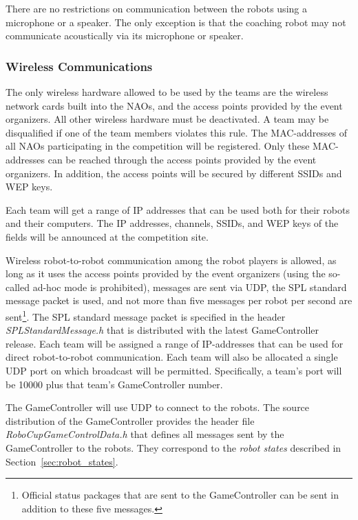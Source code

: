 \documentclass[12pt]{article}
\begin{document}
There are no restrictions on communication between the robots using a microphone or a speaker.  The only exception is that the coaching robot may not communicate acoustically via its microphone or speaker.

\subsubsection{Wireless Communications}
\label{sec:wireless}
The only wireless hardware allowed to be used by the teams are the wireless network cards built into the NAOs, and the access points provided by the event organizers. All other wireless hardware must be deactivated. A team may be disqualified if one of the team members violates this rule. The MAC-addresses of all NAOs participating in the competition will be registered. Only these MAC-addresses can be reached through the access points provided by the event organizers. In addition, the access points will be secured by different SSIDs and WEP keys. 

Each team will get a range of IP addresses that can be used both for their robots and their computers. The IP addresses, channels, SSIDs, and WEP keys of the fields will be announced at the competition site.

Wireless robot-to-robot communication among the robot players is allowed, as long as it uses the access points provided by the event organizers (using the so-called ad-hoc mode is prohibited), messages are sent via UDP, the SPL standard message packet is used, and not more than five messages per robot per second are sent\footnote{Official status packages that are sent to the GameController can be sent in addition to these five messages.}. The SPL standard message packet is specified in the header \emph{SPLStandardMessage.h} that is distributed with the latest GameController release. Each team will be assigned a range of IP-addresses that can be used for direct robot-to-robot communication. Each team will also be allocated a single UDP port on which broadcast will be permitted.  Specifically, a team's port will be 10000 plus that team's GameController number.

The GameController will use UDP to connect to the robots. The source distribution of the GameController provides the header file \emph{RoboCupGameControlData.h} that defines all messages sent by the GameController to the robots. They correspond to the \emph{robot states} described in Section~\ref{sec:robot_states}.
\end{document}

